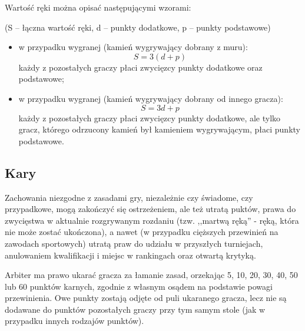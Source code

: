 Wartość ręki można opisać następującymi wzorami:

(S -- łączna wartość ręki, d -- punkty dodatkowe, p -- punkty podstawowe)
\begin{itemize}
  \item w przypadku wygranej  (kamień wygrywający dobrany z muru):
  	\begin{equation*}
		S = 3(d + p)
		\label{zimo}
	\end{equation*}
	każdy z pozostałych graczy płaci zwycięzcy punkty dodatkowe oraz podstawowe;
  \item w przypadku wygranej  (kamień wygrywający dobrany od
  innego gracza):
  	\begin{equation*}
		S = 3d +p
		\label{dian}
	\end{equation*}
	każdy z pozostałych graczy płaci zwycięzcy punkty dodatkowe, ale tylko gracz,
	którego odrzucony kamień był kamieniem wygrywającym, płaci punkty podstawowe.
\end{itemize}

\subsection{Kary}
\label{penalties}
Zachowania niezgodne z zasadami gry, niezależnie czy świadome, czy przypadkowe,
mogą zakończyć się ostrzeżeniem, ale też utratą puktów, prawa do zwycięstwa w
aktualnie rozgrywanym rozdaniu (tzw. ,,martwą ręką'' - ręką, która nie może
zostać ukończona), a nawet (w przypadku cięższych przewinień na zawodach
sportowych) utratą praw do udziału w przyszłych turniejach, anulowaniem
kwalifikacji i miejsc w rankingach oraz otwartą krytyką.

Arbiter ma prawo ukarać gracza za łamanie zasad, orzekając 5, 10, 20, 30, 40,
50 lub 60 punktów karnych, zgodnie z własnym osądem na podstawie powagi
przewinienia. Owe punkty zostają odjęte od puli ukaranego gracza, lecz nie są
dodawane do punktów pozostałych graczy przy tym samym stole (jak w przypadku
innych rodzajów punktów).

